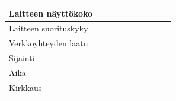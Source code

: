 \documentclass[finnish, 12pt, a4paper, elec, utf8, a-1b, online]{aaltothesis}
\begin{document}
{\begin{longtable}{p{2.5cm}|p{6cm}|p{0.5cm}p{0.5cm}p{0.5cm}|p{0.5cm}|p{0.5cm}p{0.5cm}p{0.5cm}|p{0.5cm}|}
        \midrule
        Laitteen näyttökoko                                                                                                                                                                                                                                                                                                                                                                                                         \\
        \midrule
        Laitteen suorituskyky                                                                                                                                                                                                                                                                                                                                                                                                       \\
        \midrule
        Verkkoyhteyden laatu                                                                                                                                                                                                                                                                                                                                                                                                        \\
        \midrule
        Sijainti                                                                                                                                                                                                                                                                                                                                                                                                                    \\
        \midrule
        Aika                                                                                                                                                                                                                                                                                                                                                                                                                        \\
        \midrule
        Kirkkaus                                                                                                                                                                                                                                                                                                                                                                                                                    \\

\end{longtable}}
\end{document}
